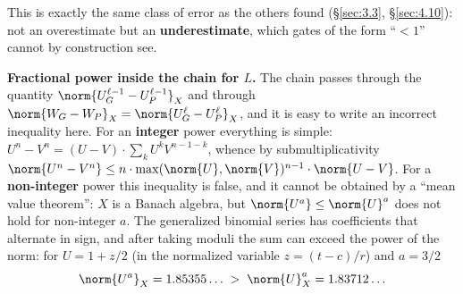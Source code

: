This is exactly the same class of error as the others found (\S\ref{sec:3.3}, \S\ref{sec:4.10}): not an overestimate but an \textbf{underestimate}, which gates of the form ``$< 1$'' cannot by construction see.

\textbf{Fractional power inside the chain for $L$.} The chain passes through the quantity $\norm{U_{G}^{\ell-1} - U_{P}^{\ell-1}}_{X}$ and through $\norm{W_{G} - W_{P}}_{X} = \norm{U_{G}^{\ell} - U_{P}^{\ell}}_{X}$, and it is easy to write an incorrect inequality here. For an \textbf{integer} power everything is simple: $U^{n} - V^{n} = (U-V)\cdot \sum_{k} U^{k} V^{n-1-k}$, whence by submultiplicativity $\norm{U^{n} - V^{n}} \le n\cdot \max(\norm{U},\norm{V})^{n-1}\cdot \norm{U-V}$. For a \textbf{non-integer} power this inequality is false, and it cannot be obtained by a ``mean value theorem'': $X$ is a Banach algebra, but $\norm{U^{a}} \le \norm{U}^{a}$ does not hold for non-integer $a$. The generalized binomial series has coefficients that alternate in sign, and after taking moduli the sum can exceed the power of the norm: for $U = 1 + z/2$ (in the normalized variable $z = (t-c)/r$) and $a = 3/2$
\[ \norm{U^{a}}_{X} = 1.85355\ldots \; > \; \norm{U}_{X}^{a} = 1.83712\ldots \]

